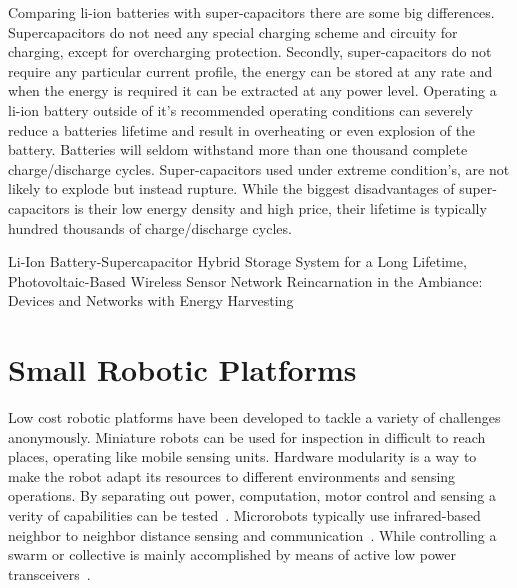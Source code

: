 
Comparing li-ion batteries with super-capacitors there are some big differences.
Supercapacitors do not need any special charging scheme and circuity for charging, except for overcharging protection.
Secondly, super-capacitors do not require any particular current profile, the energy can be stored at any rate and when the energy is required it can be extracted at any power level.
Operating a li-ion battery outside of it's recommended operating conditions can severely reduce a batteries lifetime and result in overheating or even explosion of the battery.
Batteries will seldom withstand more than one thousand complete charge/discharge cycles.
Super-capacitors used under extreme condition's, are not likely to explode but instead rupture.
While the biggest disadvantages of super-capacitors is their low energy density and high price, their lifetime is typically hundred thousands of charge/discharge cycles.

Li-Ion Battery-Supercapacitor Hybrid Storage System for a Long Lifetime, Photovoltaic-Based Wireless Sensor Network	\cite{ongaro_pwre_2012}
Reincarnation in the Ambiance: Devices and Networks with Energy Harvesting \cite{prasad_comst_2014}



\section{Small Robotic Platforms}
\label{sec:robotic_platforms}

% 

Low cost robotic platforms have been developed to tackle a variety of challenges anonymously.
Miniature robots can be used for inspection in difficult to reach places, operating like mobile sensing units.
Hardware modularity is a way to make the robot adapt its resources to different environments and sensing operations.
By separating out power, computation, motor control and sensing a verity of capabilities can be tested~\cite{sabelhaus_icra_2013, pickem_icra_2015, kim_iros_2016}.
Microrobots typically use infrared-based neighbor to neighbor distance sensing and communication~\cite{rubenstein_icra_2012, pickem_icra_2015, kim_iros_2016}.
While controlling a swarm or collective is mainly accomplished by means of active low power transceivers~\cite{sabelhaus_icra_2013, pickem_icra_2015, kim_iros_2016}. 

